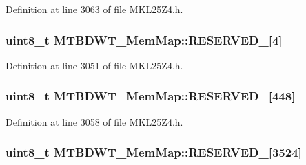 Definition at line 3063 of file M\+K\+L25\+Z4.\+h.

\subsubsection[{\texorpdfstring{R\+E\+S\+E\+R\+V\+E\+D\+\_\+0}{RESERVED_0}}]{\setlength{\rightskip}{0pt plus 5cm}uint8\+\_\+t M\+T\+B\+D\+W\+T\+\_\+\+Mem\+Map\+::\+R\+E\+S\+E\+R\+V\+E\+D\+\_\mbox{[}4\mbox{]}}\hypertarget{struct_m_t_b_d_w_t___mem_map_a4e0b43e26991088f981cfcc4d3548c01}{}\label{struct_m_t_b_d_w_t___mem_map_a4e0b43e26991088f981cfcc4d3548c01}


Definition at line 3051 of file M\+K\+L25\+Z4.\+h.

\subsubsection[{\texorpdfstring{R\+E\+S\+E\+R\+V\+E\+D\+\_\+1}{RESERVED_1}}]{\setlength{\rightskip}{0pt plus 5cm}uint8\+\_\+t M\+T\+B\+D\+W\+T\+\_\+\+Mem\+Map\+::\+R\+E\+S\+E\+R\+V\+E\+D\+\_\mbox{[}448\mbox{]}}\hypertarget{struct_m_t_b_d_w_t___mem_map_aafe008f8a3ddd6bb4b58dc3309fad883}{}\label{struct_m_t_b_d_w_t___mem_map_aafe008f8a3ddd6bb4b58dc3309fad883}


Definition at line 3058 of file M\+K\+L25\+Z4.\+h.

\subsubsection[{\texorpdfstring{R\+E\+S\+E\+R\+V\+E\+D\+\_\+2}{RESERVED_2}}]{\setlength{\rightskip}{0pt plus 5cm}uint8\+\_\+t M\+T\+B\+D\+W\+T\+\_\+\+Mem\+Map\+::\+R\+E\+S\+E\+R\+V\+E\+D\+\_\mbox{[}3524\mbox{]}}\hypertarget{struct_m_t_b_d_w_t___mem_map_a87be1a8207dafcd8e23d78b12b05fb64}{}\label{struct_m_t_b_d_w_t___mem_map_a87be1a8207dafcd8e23d78b12b05fb64}


